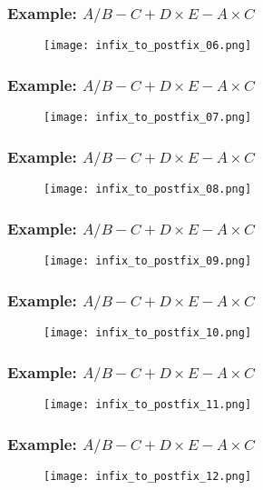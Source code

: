 \documentclass[11pt]{beamer}
\begin{document}
\begin{frame}
\frametitle{Example: $A/B-C+D\times E-A\times C$}
\begin{figure}
\centering
\texttt{[image: infix\_to\_postfix\_06.png]}
\end{figure}
\end{frame}

\begin{frame}
\frametitle{Example: $A/B-C+D\times E-A\times C$}
\begin{figure}
\centering
\texttt{[image: infix\_to\_postfix\_07.png]}
\end{figure}
\end{frame}

\begin{frame}
\frametitle{Example: $A/B-C+D\times E-A\times C$}
\begin{figure}
\centering
\texttt{[image: infix\_to\_postfix\_08.png]}
\end{figure}
\end{frame}

\begin{frame}
\frametitle{Example: $A/B-C+D\times E-A\times C$}
\begin{figure}
\centering
\texttt{[image: infix\_to\_postfix\_09.png]}
\end{figure}
\end{frame}

\begin{frame}
\frametitle{Example: $A/B-C+D\times E-A\times C$}
\begin{figure}
\centering
\texttt{[image: infix\_to\_postfix\_10.png]}
\end{figure}
\end{frame}

\begin{frame}
\frametitle{Example: $A/B-C+D\times E-A\times C$}
\begin{figure}
\centering
\texttt{[image: infix\_to\_postfix\_11.png]}
\end{figure}
\end{frame}

\begin{frame}
\frametitle{Example: $A/B-C+D\times E-A\times C$}
\begin{figure}
\centering
\texttt{[image: infix\_to\_postfix\_12.png]}
\end{figure}
\end{frame}
\end{document}
